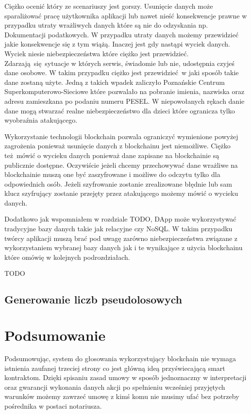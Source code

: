 \documentclass[]{llncs}
\begin{document}
  Ciężko ocenić który ze scenariuszy jest gorszy. Usunięcie danych może
  sparaliżować pracę użytkownika aplikacji lub nawet nieść konsekwencje prawne w
  przypadku utraty wrażliwych danych które są nie do odzyskania np. Dokumentacji
  podatkowych\cite{utrata-dokumentacji}. W przypadku utraty danych możemy
  przewidzieć jakie konsekwencje się z tym wiążą. Inaczej jest gdy nastąpi
  wyciek danych. Wyciek niesie niebezpieczeństwa które ciężko jest przewidzieć.
  Zdarzają się sytuacje w których serwis, świadomie lub nie, udostępnia czyjeś
  dane osobowe. W takim przypadku ciężko jest przewidzieć w jaki sposób takie
  dane zostaną użyte. Jedną z takich wpadek zaliczyło Poznańskie Centrum
  Superkomputerowo-Sieciowe które pozwalało na pobranie imienia, nazwiska oraz
  adresu zamieszkana po podaniu numeru PESEL\cite{dane-dzieci}. W niepowołanych
  rękach danie dane mogą stwarzać realne niebezpieczeństwo dla dzieci które
  ogranicza tylko wyobraźnia atakującego.

  Wykorzystanie technologii blockchain pozwala ograniczyć wymienione powyżej
  zagrożenia ponieważ usunięcie danych z blockchainu jest niemożliwe. Ciężko
  też mówić o wycieku danych ponieważ dane zapisane na blockchainie są
  publicznie dostępne. Oczywiście jeżeli chcemy przechowywać dane wrażliwe na
  blockchainie muszą one być zaszyfrowane i możliwe do odczytu tylko dla
  odpowiednich osób. Jeżeli szyfrowanie zostanie zrealizowane błędnie lub sam
  klucz szyfrujący zostanie przejęty przez atakującego możemy mówić o wycieku
  danych.

  Dodatkowo jak wspomniałem w rozdziale TODO, DApp może wykorzystywać tradycyjne
  bazy danych takie jak relacyjne czy NoSQL. W takim przypadku twórcy aplikacji
  muszą brać pod uwagę zarówno niebezpieczeństwa związane z wykorzystaniem
  wybranej bazy danych jak i te wynikające z użycia blockchainu które omówię w
  kolejnych podrozdziałach.

  TODO
  \cite{open-zeppelin}

\subsection{Generowanie liczb pseudolosowych}

\cite{liczby-losowe}

\section{Podsumowanie}

  Podsumowując, system do głosowania wykorzystujący blockchain nie wymaga
  istnienia zaufanej trzeciej strony co jest główną ideą przyświecającą smart
  kontraktom. Dzięki spisaniu zasad umowy w sposób jednoznaczny w interpretacji
  oraz gwarancji wykonania danych akcji po spełnieniu wcześniej przyjętych
  warunków możemy zawrzeć umowę z kimś komu nie musimy ufać bez potrzeby
  pośrednika w postaci notariusza.
\end{document}
